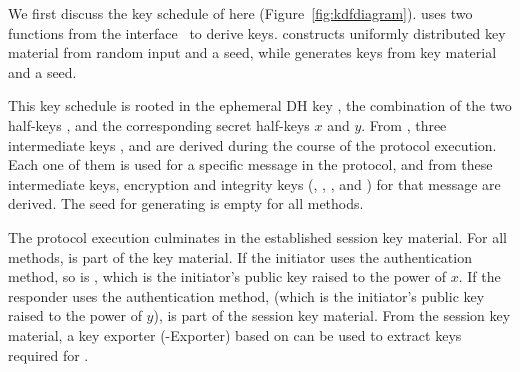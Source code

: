 %
%
%
We first discuss the key schedule of \mEdhoc{} here (Figure~\ref{fig:kdfdiagram}). \mEdhoc{} uses two functions from the \mHkdf{} interface~\cite{rfc5869} to derive keys.
%
\mHkdfExtract{} 
constructs uniformly distributed key material from random input and a seed,
while \mHkdfExpand{} generates keys from key material and a seed.
%
%

This key schedule is rooted in the ephemeral DH key \mGxy{}, the combination
of the two half-keys \mGx{}, \mGy{} and the corresponding secret half-keys $x$ and $y$.
%
From \mGxy{}, three intermediate keys \mPRKtwo, \mPRKthree{} and
\mPRKfour{} are derived during the course of the protocol execution.
%
Each one of them is used for a specific message in the protocol, and from
these intermediate keys, encryption and integrity keys
(\mKtwoe, \mKtwom{}, \mKthreeae, and \mKthreem) for that message are derived.
%
The seed for generating \mPRKtwo{} is empty for all methods. %
%

%

The protocol execution culminates in the established session key material.
%
%
For all methods, \mGxy{} is part of the key material.
%
If the initiator uses the \mStat{} authentication method, so is \mGrx, which is
the initiator's public key \mGr{} raised to the power of $x$.
%
If the responder uses the \mStat{} authentication method, \mGiy{} (which is
the initiator's public key \mGi{} raised to the power of $y$), is part of the
session key material.
%
From the session key material, a key exporter (\mEdhoc-Exporter) based on
\mHkdf{} can be used to extract %
keys required for \mOscore{}.
%
%


